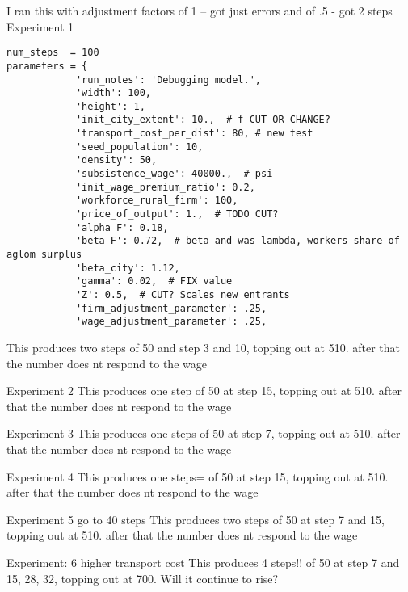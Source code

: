 I ran this with adjustment factors of 1 -- got just errors and of .5 - got 2 steps
Experiment 1
\begin{verbatim}
num_steps  = 100
parameters = {
            'run_notes': 'Debugging model.',
            'width': 100,
            'height': 1,
            'init_city_extent': 10.,  # f CUT OR CHANGE?
            'transport_cost_per_dist': 80, # new test
            'seed_population': 10,
            'density': 50,
            'subsistence_wage': 40000.,  # psi
            'init_wage_premium_ratio': 0.2,
            'workforce_rural_firm': 100,
            'price_of_output': 1.,  # TODO CUT?
            'alpha_F': 0.18,
            'beta_F': 0.72,  # beta and was lambda, workers_share of aglom surplus
            'beta_city': 1.12,
            'gamma': 0.02,  # FIX value
            'Z': 0.5,  # CUT? Scales new entrants
            'firm_adjustment_parameter': .25,
            'wage_adjustment_parameter': .25,
\end{verbatim}

This produces two steps of 50 and step 3 and 10, topping out at 510. after that the number does nt respond to the wage

Experiment 2
 This produces one step of 50 at step 15, topping out at 510. after that the number does nt respond to the wage

 Experiment 3
 This produces one steps of 50 at step 7, topping out at 510. after that the number does nt respond to the wage

 
 Experiment 4
 This produces one steps= of 50 at step 15, topping out at 510. after that the number does nt respond to the wage

 
 Experiment 5 go to 40 steps
 This produces two steps of 50 at step  7 and 15, topping out at 510. after that the number does nt respond to the wage

 
 Experiment: 6   higher transport cost
 This produces 4 steps!!  of 50 at step  7 and 15, 28, 32, topping out at 700. Will it continue to rise?

